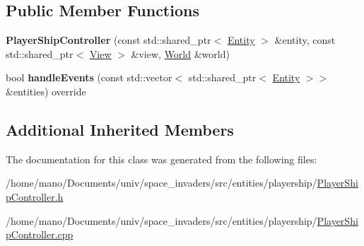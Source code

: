 \subsection*{Public Member Functions}
\begin{DoxyCompactItemize}
\item 
\mbox{\label{classentities_1_1playership_1_1PlayerShipController_a5f57a0601302205580b099c4037ab2d7}} 
{\bfseries Player\+Ship\+Controller} (const std\+::shared\+\_\+ptr$<$ \hyperlink{classentities_1_1Entity}{Entity} $>$ \&entity, const std\+::shared\+\_\+ptr$<$ \hyperlink{classentities_1_1View}{View} $>$ \&view, \hyperlink{classWorld}{World} \&world)
\item 
\mbox{\label{classentities_1_1playership_1_1PlayerShipController_ad3af27cacdd1e761b9ae2fab78814325}} 
bool {\bfseries handle\+Events} (const std\+::vector$<$ std\+::shared\+\_\+ptr$<$ \hyperlink{classentities_1_1Entity}{Entity} $>$$>$ \&entities) override
\end{DoxyCompactItemize}
\subsection*{Additional Inherited Members}


The documentation for this class was generated from the following files\+:\begin{DoxyCompactItemize}
\item 
/home/mano/\+Documents/univ/space\+\_\+invaders/src/entities/playership/\hyperlink{PlayerShipController_8h}{Player\+Ship\+Controller.\+h}\item 
/home/mano/\+Documents/univ/space\+\_\+invaders/src/entities/playership/\hyperlink{PlayerShipController_8cpp}{Player\+Ship\+Controller.\+cpp}\end{DoxyCompactItemize}
